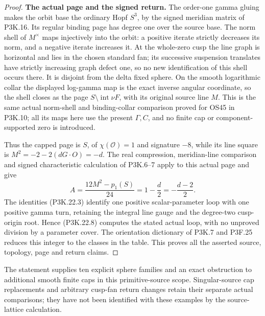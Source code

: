 \begin{proof}
\par\medskip\noindent\textbf{The actual page and the signed return.}\enspace
The order-one gamma gluing makes the orbit base the ordinary Hopf
\(S^3\), by the signed meridian matrix of P3K.16.  Its regular
binding page has degree one over the source base.  The norm shell
of \(M^\times\) maps injectively into the orbit: a positive iterate
strictly decreases its norm, and a negative iterate increases it.
At the whole-zero cusp the line graph is horizontal and lies in
the chosen standard fan; its successive suspension translates have
strictly increasing graph defect one, so no new identification of
this shell occurs there.  It is disjoint from the delta fixed
sphere.  On the smooth logarithmic collar the displayed log-gamma
map is the exact inverse angular coordinate, so the shell closes
as the page \(S\setminus\operatorname{int}\nu F\), with its
original source line \(M\).  This is the same actual norm-shell
and binding-collar comparison proved for OS45 in P3K.10; all its
maps here use the present \(\Gamma,C\), and no finite cap or
component-supported zero is introduced.

Thus the capped page is \(S\), of \(\chi(\mathcal O)=1\) and
signature \(-8\), while its line square is
\(M^2=-2-2(dG\cdot O)=-d\).  The real compression, meridian-line
comparison and signed characteristic calculation of P3K.6--7 apply
to this actual page and give
\[
 A=\frac{12M^2-p_1(S)}{24}
   =1-\frac d2=-\frac{d-2}{2}.                        \tag{P3K.22.8}
\]
The identities (P3K.22.3) identify one positive scalar-parameter
loop with one positive gamma turn, retaining the integral line
gauge and the degree-two cusp-origin root.  Hence (P3K.22.8)
computes the stated actual loop, with no unproved division by a
parameter cover.  The orientation dictionary of P3K.7 and P3F.25
reduces this integer to the classes in the table.  This proves all
the asserted source, topology, page and return claims.
\end{proof}

The statement supplies ten explicit sphere families and an exact
obstruction to additional smooth finite caps in this primitive-source
scope.  Singular-source cap replacements and arbitrary cusp-fan return
changes retain their separate actual comparisons; they have not been
identified with these examples by the source-lattice calculation.

